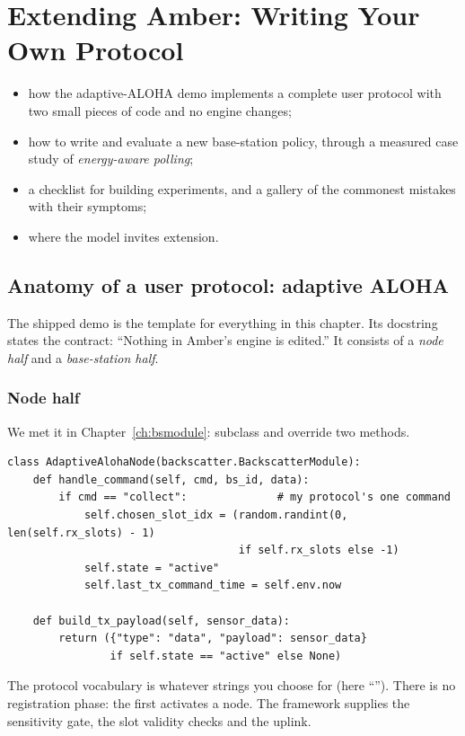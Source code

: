 \chapter{Extending Amber: Writing Your Own Protocol}
\label{ch:extending}

\begin{defbox}
\begin{itemize}
 \item how the adaptive-ALOHA demo implements a complete user protocol with two small pieces of code and no engine changes;
 \item how to write and evaluate a new base-station policy, through a measured case study of \emph{energy-aware polling};
 \item a checklist for building experiments, and a gallery of the commonest mistakes with their symptoms;
 \item where the model invites extension.
\end{itemize}
\end{defbox}

\section{Anatomy of a user protocol: adaptive ALOHA}
\label{sec:anatomy}

The shipped  demo is the template for everything in this chapter. Its docstring states the contract: ``Nothing in Amber's engine is edited.'' It consists of a \emph{node half} and a \emph{base-station half}.

\subsection{Node half}
We met it in Chapter~\ref{ch:bsmodule}: subclass  and override two methods.
\begin{lstlisting}
class AdaptiveAlohaNode(backscatter.BackscatterModule):
    def handle_command(self, cmd, bs_id, data):
        if cmd == "collect":              # my protocol's one command
            self.chosen_slot_idx = (random.randint(0, len(self.rx_slots) - 1)
                                    if self.rx_slots else -1)
            self.state = "active"
            self.last_tx_command_time = self.env.now

    def build_tx_payload(self, sensor_data):
        return ({"type": "data", "payload": sensor_data}
                if self.state == "active" else None)
\end{lstlisting}
The protocol vocabulary is whatever strings you choose for  (here ``''). There is no registration phase: the first  activates a node. The framework supplies the sensitivity gate, the slot validity checks and the uplink.

